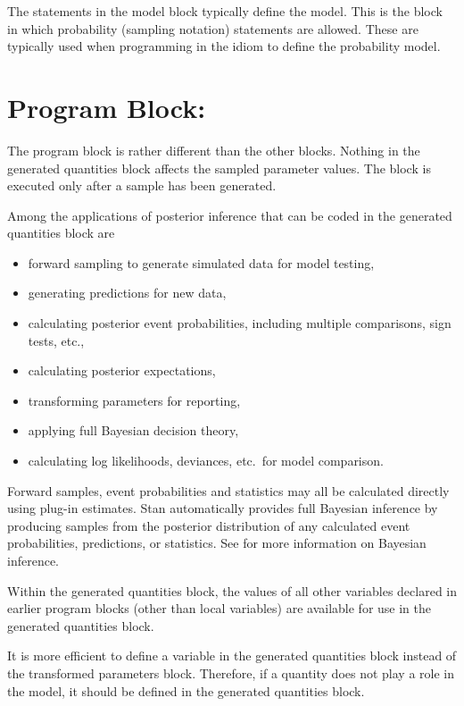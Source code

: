 The statements in the model block typically define the model.  This is
the block in which probability (sampling notation) statements are
allowed.  These are typically used when programming in the \BUGS idiom
to define the probability model.  


\section{Program Block: }

The  program block is rather different than
the other blocks.  Nothing in the generated quantities block affects
the sampled parameter values.  The block is executed only after a
sample has been generated.  

Among the applications of posterior inference that can be coded in the
generated quantities block are
%
\begin{itemize}
\item forward sampling to generate simulated data for model testing,
\item generating predictions for new data,
\item calculating posterior event probabilities, including multiple comparisons,
  sign tests, etc.,
\item calculating posterior expectations,
\item transforming parameters for reporting,
\item applying full Bayesian decision theory,
\item calculating log likelihoods, deviances, etc.\ for model comparison.
\end{itemize}
%
Forward samples, event probabilities and statistics may all be
calculated directly using plug-in estimates.  Stan automatically
provides full Bayesian inference by producing samples from the
posterior distribution of any calculated event probabilities,
predictions, or statistics.  See  for more
information on Bayesian inference.

Within the generated quantities block, the values of all other variables
declared in earlier program blocks (other than local variables) are
available for use in the generated quantities block.

It is more efficient to define a variable in the generated quantities
block instead of the transformed parameters block.  Therefore, if a
quantity does not play a role in the model, it should be defined in
the generated quantities block.  

